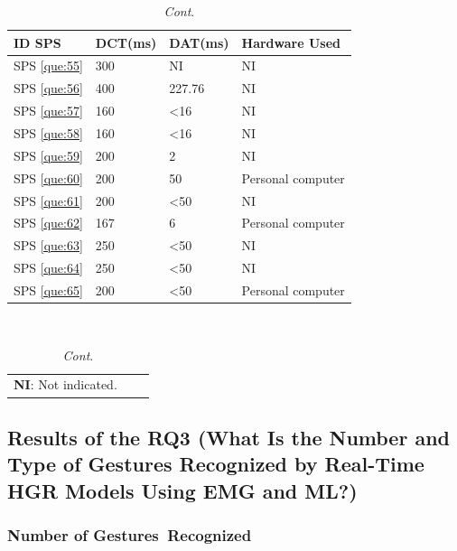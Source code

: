 \documentclass[sensors,review,accept,moreauthors,pdftex]{Definitions/mdpi}
\begin{document}
\begin{table}[H]\ContinuedFloat
\centering
\caption{\textit{Cont}.}
\begin{tabular}{p{33pt}p{40pt}p{40pt}p{100pt}}
	\toprule
		\textbf{ID SPS}&\textbf{DCT(ms)}&\textbf{DAT(ms)}&\textbf{Hardware Used}\\
	\midrule

		
		SPS \ref{que:55}	&	300	&	NI	&	NI	\\	
		SPS \ref{que:56}	&	400	&	227.76	&	NI	\\	
		
		SPS \ref{que:57}	&	160	&	<16	&	NI	\\	
		SPS \ref{que:58}	&	160	&	<16	&	NI	\\	
		SPS \ref{que:59}	&	200	&	2	&	NI	\\	
		SPS \ref{que:60}	&	200	&	50	&	Personal computer	\\	
		SPS \ref{que:61}	&	200	&	<50	&	NI	\\	
		SPS \ref{que:62}	&	167	&	6	&	Personal computer	\\	
		SPS \ref{que:63}	&	250	&	<50	&	NI	\\	
		SPS \ref{que:64}	&	250	&	<50	&	NI	\\	
		SPS \ref{que:65}	&	200	&	<50	&	Personal computer	\\	
		
		
			\bottomrule
		\end{tabular}\\
\begin{tabular}{ccc}
\multicolumn{1}{c}{\footnotesize \textbf{NI}: Not indicated.}
\end{tabular}


%		
	\end{table}

	

\subsection{Results of the RQ3 (What Is the Number and Type of Gestures Recognized by Real-Time HGR Models Using EMG and ML?)}
\unskip

\subsubsection{Number of Gestures~Recognized}
\end{document}
